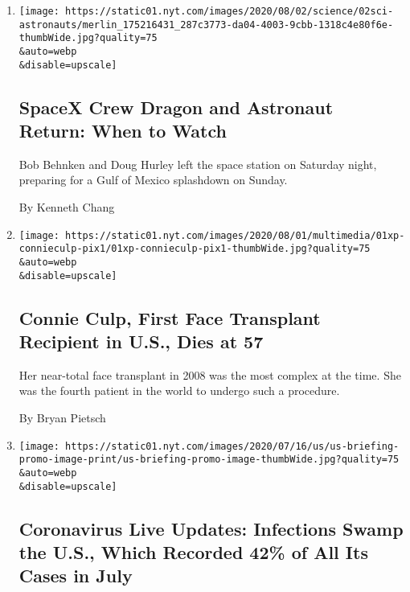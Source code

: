 \begin{enumerate}
\def\labelenumi{\arabic{enumi}.}
\item
  \href{/2020/08/02/science/spacex-nasa-return.html}{}

  \texttt{[image: https://static01.nyt.com/images/2020/08/02/science/02sci-astronauts/merlin\_175216431\_287c3773-da04-4003-9cbb-1318c4e80f6e-thumbWide.jpg?quality=75\\\&auto=webp\\\&disable=upscale]}

  \hypertarget{spacex-crew-dragon-and-astronaut-return-when-to-watch}{%
  \subsection{SpaceX Crew Dragon and Astronaut Return: When to
  Watch}\label{spacex-crew-dragon-and-astronaut-return-when-to-watch}}

  Bob Behnken and Doug Hurley left the space station on Saturday night,
  preparing for a Gulf of Mexico splashdown on Sunday.

  By Kenneth Chang
\item
  \href{/2020/08/01/us/Connie-culp-dead-face-transplant.html}{}

  \texttt{[image: https://static01.nyt.com/images/2020/08/01/multimedia/01xp-connieculp-pix1/01xp-connieculp-pix1-thumbWide.jpg?quality=75\\\&auto=webp\\\&disable=upscale]}

  \hypertarget{connie-culp-first-face-transplant-recipient-in-us-dies-at-57}{%
  \subsection{Connie Culp, First Face Transplant Recipient in U.S., Dies
  at
  57}\label{connie-culp-first-face-transplant-recipient-in-us-dies-at-57}}

  Her near-total face transplant in 2008 was the most complex at the
  time. She was the fourth patient in the world to undergo such a
  procedure.

  By Bryan Pietsch
\item
  \href{/2020/08/01/world/coronavirus-covid-19.html}{}

  \texttt{[image: https://static01.nyt.com/images/2020/07/16/us/us-briefing-promo-image-print/us-briefing-promo-image-thumbWide.jpg?quality=75\\\&auto=webp\\\&disable=upscale]}

  \hypertarget{coronavirus-live-updates-infections-swamp-the-us-which-recorded-42-of-all-its-cases-in-july}{%
  \subsection{Coronavirus Live Updates: Infections Swamp the U.S., Which
  Recorded 42\% of All Its Cases in
  July}\label{coronavirus-live-updates-infections-swamp-the-us-which-recorded-42-of-all-its-cases-in-july}}


\end{enumerate}
